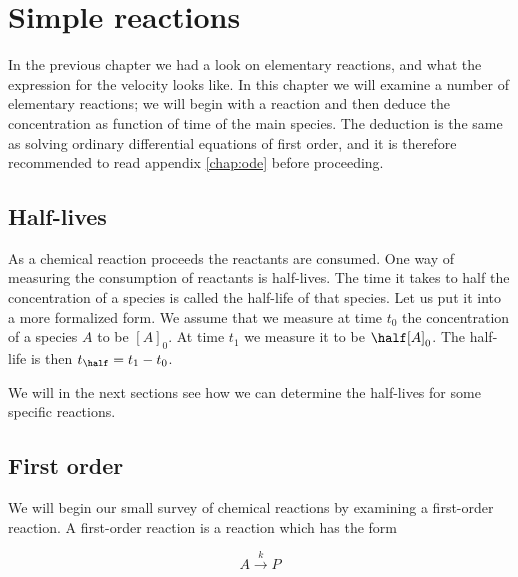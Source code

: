 
\chapter{Simple reactions}
\label{chap:simpleReactions}

In the previous chapter we had a look on elementary reactions, and what the expression for the velocity looks like. In this chapter we will examine a number of elementary reactions; we will begin with a reaction and then deduce the concentration as function of time of the main species. The deduction is the same as solving ordinary differential equations of first order, and it is therefore recommended to read appendix \ref{chap:ode} before proceeding.

\section{Half-lives}
\label{sec:halfLives}

As a chemical reaction proceeds the reactants are consumed. One way of measuring the consumption of reactants is half-lives. The time it takes to half the concentration of a species is called the half-life of that species. Let us put it into a more formalized form. We assume that we measure at time $t_0$ the concentration of a species $A$ to be $[A]_0$. At time $t_1$ we measure it to be $\half[A]_0$. The half-life is then $t_\half = t_1 - t_0$.

We will in the next sections see how we can determine the half-lives for some specific reactions.

\section{First order}
\label{sec:firstOrder}

We will begin our small survey of chemical reactions by examining a first-order reaction. A first-order reaction is a reaction which has the form

\begin{equation}
  \label{eq:firstOrderReaction}
  A \overset{k}{\rightarrow} P
\end{equation}

